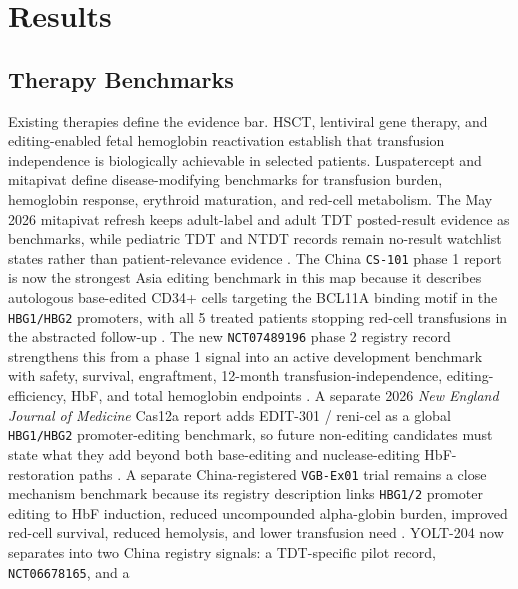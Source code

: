 \section{Results}

\subsection{Therapy Benchmarks}

Existing therapies define the evidence bar. HSCT, lentiviral gene therapy, and
editing-enabled fetal hemoglobin reactivation establish that transfusion
independence is biologically achievable in selected patients. Luspatercept and
mitapivat define disease-modifying benchmarks for transfusion burden,
hemoglobin response, erythroid maturation, and red-cell metabolism. The May
2026 mitapivat refresh keeps adult-label and adult TDT posted-result evidence
as benchmarks, while pediatric TDT and NTDT records remain no-result watchlist
states rather than patient-relevance evidence
\cite{cappellini2020luspatercept,taher2025energize,fda2025aqvesme,clinicaltrials2026energizeT,clinicaltrials2026mitapivatPediatricTdt,clinicaltrials2026mitapivatPediatricNtdt}. The China
\texttt{CS-101} phase 1 report is now the strongest Asia editing benchmark in
this map because it describes autologous base-edited CD34+ cells targeting the
BCL11A binding motif in the \texttt{HBG1/HBG2} promoters, with all 5 treated
patients stopping red-cell transfusions in the abstracted follow-up
\cite{lai2026cs101BaseEditing,clinicaltrials2026cs101}. The new
\texttt{NCT07489196} phase 2 registry record strengthens this from a phase 1
signal into an active development benchmark with safety, survival, engraftment,
12-month transfusion-independence, editing-efficiency, HbF, and total
hemoglobin endpoints \cite{clinicaltrials2026cs101Phase2}. A separate
2026 \textit{New England Journal of Medicine} Cas12a report adds EDIT-301 /
reni-cel as a global \texttt{HBG1/HBG2} promoter-editing benchmark, so future
non-editing candidates must state what they add beyond both base-editing and
nuclease-editing HbF-restoration paths \cite{frangoul2026cas12aHbg}. A
separate China-registered \texttt{VGB-Ex01} trial remains a close mechanism
benchmark because its registry description links \texttt{HBG1/2} promoter editing to HbF
induction, reduced uncompounded alpha-globin burden, improved red-cell
survival, reduced hemolysis, and lower transfusion need
\cite{clinicaltrials2026vgbEx01}. YOLT-204 now separates into two China
registry signals: a TDT-specific pilot record, \texttt{NCT06678165}, and a
